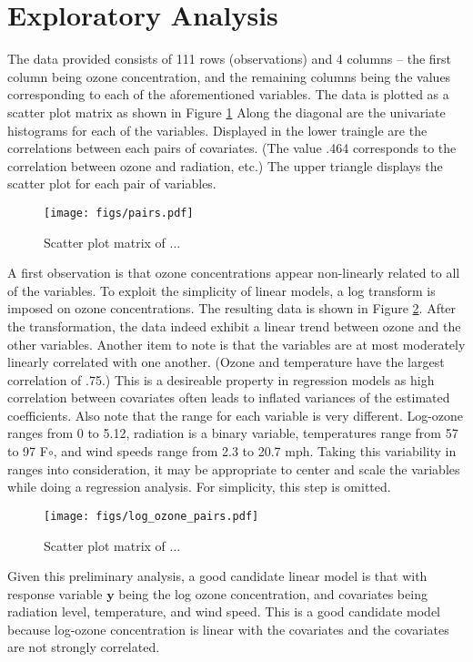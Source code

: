 \documentclass{../../tex_template/asaproc}
\newcommand{\y}{\bm y}
\begin{document}
\section{Exploratory Analysis}
The data provided consists of 111 rows (observations) and 4 columns -- the
first column being ozone concentration, and the remaining columns being the
values corresponding to each of the aforementioned variables. The data is
plotted as a scatter plot matrix as shown in Figure \ref{fig:pairs} Along the
diagonal are the univariate histograms for each of the variables. Displayed in the
lower traingle are the correlations between each pairs of covariates. (The 
value .464 corresponds to the correlation between ozone and radiation, etc.)
The upper triangle displays the scatter plot for each pair of variables.\\

\begin{figure}[H]
  \texttt{[image: figs/pairs.pdf]}
  \caption{\small Scatter plot matrix of ... }
  \label{fig:pairs}
\end{figure}

A first observation is that ozone concentrations appear non-linearly related to
all of the variables. To exploit the simplicity of linear models, a log
transform is imposed on ozone concentrations. The resulting data is shown in
Figure \ref{fig:logpairs}. After the transformation, the data indeed exhibit a
linear trend between ozone and the other variables. Another item to note is
that the variables are at most moderately linearly correlated with one another.
(Ozone and temperature have the largest correlation of .75.) This is a
desireable property in regression models as high correlation between covariates
often leads to inflated variances of the estimated coefficients. Also note that
the range for each variable is very different. Log-ozone ranges from 0 to 5.12,
radiation is a binary variable, temperatures range from 57 to 97 F$\circ$, and
wind speeds range from 2.3 to 20.7 mph. Taking this variability in ranges into
consideration, it may be appropriate to center and scale the variables while
doing a regression analysis. For simplicity, this step is omitted.

\begin{figure}[H]
  \texttt{[image: figs/log\_ozone\_pairs.pdf]}
  \caption{\small Scatter plot matrix of ... }
  \label{fig:logpairs}
\end{figure}

Given this preliminary analysis, a good candidate linear model is that with
response variable $\y$ being the log ozone concentration, and covariates being
radiation level, temperature, and wind speed. This is a good candidate model
because log-ozone concentration is linear with the covariates and the 
covariates are not strongly correlated.
\end{document}
